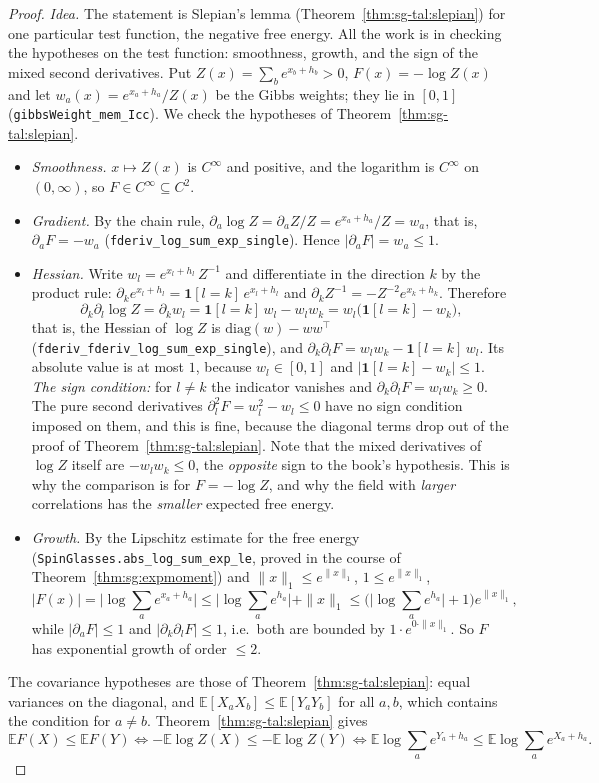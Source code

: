 \begin{proof}
  \leanok
\emph{Idea.} The statement is Slepian's lemma (Theorem~\ref{thm:sg-tal:slepian}) for one particular test function, the negative free energy. All the work is in checking the hypotheses on the test function: smoothness, growth, and the sign of the mixed second derivatives.
Put $Z(x)=\sum_be^{x_b+h_b}>0$, $F(x)=-\log Z(x)$ and let $w_a(x)=e^{x_a+h_a}/Z(x)$ be the Gibbs weights; they lie in $[0,1]$ (\texttt{gibbsWeight\_mem\_Icc}). We check the hypotheses of Theorem~\ref{thm:sg-tal:slepian}.
\begin{itemize}
\item \emph{Smoothness.} $x\mapsto Z(x)$ is $C^\infty$ and positive, and the logarithm is $C^\infty$ on $(0,\infty)$, so $F\in C^\infty\subseteq C^2$.
\item \emph{Gradient.} By the chain rule, $\partial_a\log Z=\partial_aZ/Z=e^{x_a+h_a}/Z=w_a$, that is, $\partial_aF=-w_a$ (\texttt{fderiv\_log\_sum\_exp\_single}). Hence $|\partial_aF|=w_a\le1$.
\item \emph{Hessian.} Write $w_l=e^{x_l+h_l}\,Z^{-1}$ and differentiate in the direction $k$ by the product rule: $\partial_ke^{x_l+h_l}=\mathbf 1[l=k]\,e^{x_l+h_l}$ and $\partial_kZ^{-1}=-Z^{-2}e^{x_k+h_k}$. Therefore
  \[
  \partial_k\partial_l\log Z=\partial_kw_l=\mathbf 1[l=k]\,w_l-w_lw_k=w_l\big(\mathbf 1[l=k]-w_k\big),
  \]
  that is, the Hessian of $\log Z$ is $\mathrm{diag}(w)-ww^{\top}$ (\texttt{fderiv\_fderiv\_log\_sum\_exp\_single}), and $\partial_k\partial_lF=w_lw_k-\mathbf 1[l=k]\,w_l$. Its absolute value is at most $1$, because $w_l\in[0,1]$ and $|\mathbf 1[l=k]-w_k|\le1$.
  \emph{The sign condition:} for $l\ne k$ the indicator vanishes and $\partial_k\partial_lF=w_lw_k\ge0$. The pure second derivatives $\partial_l^2F=w_l^2-w_l\le0$ have no sign condition imposed on them, and this is fine, because the diagonal terms drop out of the proof of Theorem~\ref{thm:sg-tal:slepian}.
  Note that the mixed derivatives of $\log Z$ itself are $-w_lw_k\le0$, the \emph{opposite} sign to the book's hypothesis. This is why the comparison is for $F=-\log Z$, and why the field with \emph{larger} correlations has the \emph{smaller} expected free energy.
\item \emph{Growth.} By the Lipschitz estimate for the free energy (\texttt{SpinGlasses.abs\_log\_sum\_exp\_le}, proved in the course of Theorem~\ref{thm:sg:expmoment}) and $\|x\|_1\le e^{\|x\|_1}$, $1\le e^{\|x\|_1}$,
  \[
  |F(x)|=\Big|\log\sum_ae^{x_a+h_a}\Big|\le\Big|\log\sum_ae^{h_a}\Big|+\|x\|_1\le\Big(\Big|\log\sum_ae^{h_a}\Big|+1\Big)e^{\|x\|_1},
  \]
  while $|\partial_aF|\le1$ and $|\partial_k\partial_lF|\le1$, i.e.\ both are bounded by $1\cdot e^{0\cdot\|x\|_1}$. So $F$ has exponential growth of order $\le2$.
\end{itemize}
The covariance hypotheses are those of Theorem~\ref{thm:sg-tal:slepian}: equal variances on the diagonal, and $\mathbb{E}[X_aX_b]\le\mathbb{E}[Y_aY_b]$ for all $a,b$, which contains the condition for $a\ne b$. Theorem~\ref{thm:sg-tal:slepian} gives
\[
\mathbb{E}F(X)\le\mathbb{E}F(Y)\iff-\mathbb{E}\log Z(X)\le-\mathbb{E}\log Z(Y)\iff\mathbb{E}\log\sum_ae^{Y_a+h_a}\le\mathbb{E}\log\sum_ae^{X_a+h_a}.
\]


\end{proof}
